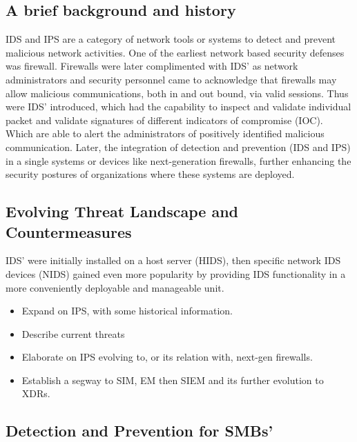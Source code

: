 
\subsection{A brief background and history}

IDS and IPS are a category of network tools or systems to detect and prevent malicious network activities. One of the earliest network based security defenses was firewall. Firewalls were later complimented with IDS' as network administrators and security personnel came to acknowledge that firewalls may allow malicious communications, both in and out bound, via valid sessions. Thus were IDS' introduced, which had the capability to inspect and validate individual packet and validate signatures of different indicators of compromise (IOC). Which are able to alert the administrators of positively identified malicious communication. Later, the integration of detection and prevention (IDS and IPS) in a single systems or devices like next-generation firewalls, further enhancing the security postures of organizations where these systems are deployed.

\subsection{Evolving Threat Landscape and Countermeasures}

IDS' were initially installed on a host server (HIDS), then specific network IDS devices (NIDS) gained even more popularity by providing IDS functionality in a more conveniently deployable and manageable unit.

\begin{followup}[to-do]
    \begin{itemize}
        \item Expand on IPS, with some historical information.
        \item Describe current threats
        \item Elaborate on IPS evolving to, or its relation with, next-gen firewalls.
        \item Establish a segway to SIM, EM then SIEM and its further evolution to XDRs.
    \end{itemize}
\end{followup}

\subsection{Detection and Prevention for SMBs'}

